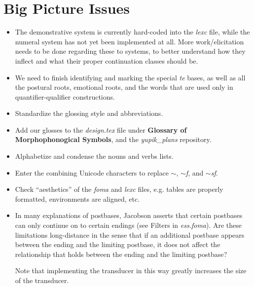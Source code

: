 \documentclass{article}
\begin{document}

\section{Big Picture Issues}

\begin{itemize}
\renewcommand\labelitemi{$\cdot$}

\item The demonstrative system is currently hard-coded into the \textit{lexc} file, while the numeral system has not yet been implemented at all.
%
More work/elicitation needs to be done regarding these to systems, to better understand how they inflect and what their proper continuation classes should be.

\item We need to finish identifying and marking the special \textit{te} bases, as well as all the postural roots, emotional roots, and the words that are used only in quantifier-qualifier constructions.

\item Standardize the glossing style and abbreviations.

\item Add our glosses to the \textit{design.tex} file under \textbf{Glossary of Morphophonogical Symbols}, and the \textit{yupik\_plans} repository.

\item Alphabetize and condense the nouns and verbs lists.

\item Enter the combining Unicode characters to replace \textit{$\sim$}, \textit{$\sim$f}, and \textit{$\sim$sf}.

\item Check ``aesthetics'' of the \textit{foma} and \textit{lexc} files, e.g. tables are properly formatted, environments are aligned, etc.

\item In many explanations of postbases, Jacobson asserts that certain postbases can only continue on to certain endings (see Filters in \textit{ess.foma}).
%
Are these limitations long-distance in the sense that if an additional postbase appears between the ending and the limiting postbase, it does not affect the relationship that holds between the ending and the limiting postbase?

Note that implementing the transducer in this way greatly increases the size of the transducer.

\end{itemize}
\end{document}
